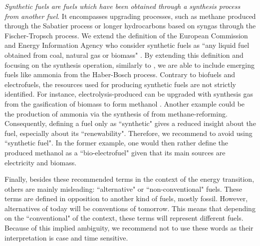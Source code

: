 \textit{Synthetic fuels are fuels which have been obtained through a synthesis process from another fuel}. It encompasses upgrading processes, such as methane produced through the Sabatier process or longer hydrocarbons based on syngas through the Fischer-Tropsch process. We extend the definition of the European Commission and Energy Information Agency who consider synthetic fuels as ``any liquid fuel obtained from coal, natural gas or biomass" \cite{eia2006, eu_synthetic}. By extending this definition and focusing on the synthesis operation, similarly to \citet{speight2020synthetic}, we are able to include emerging fuels like ammonia from the Haber-Bosch process. Contrary to biofuels and electrofuels, the resources used for producing synthetic fuels are not strictly identified. For instance, electrolysis-produced  can be upgraded with synthesis gas from the gasification of biomass to form methanol \cite{mignard2008}. Another example could be the production of ammonia via the synthesis of  from methane-reforming. Consequently, defining a fuel only as ``synthetic" gives a reduced insight about the fuel, especially about its ``renewability". Therefore, we recommend to avoid using ``synthetic fuel". In the former example, one would then rather define the produced methanol as a ``bio-electrofuel" given that its main sources are electricity and biomass. 

Finally, besides these recommended terms in the context of the energy transition, others are mainly misleading: ``alternative" or ``non-conventional" fuels. These terms are defined in opposition to another kind of fuels, mostly fossil. However, alternatives of today will be conventions of tomorrow. This means that depending on the ``conventional" of the context, these terms will represent different fuels. Because of this implied ambiguity, we recommend not to use these words as their interpretation is case and time sensitive.

